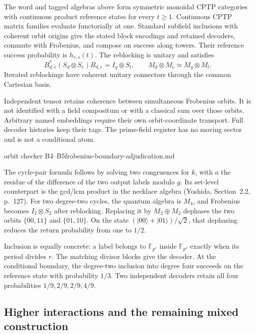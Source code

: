 \begin{proposition}
\statusProved\quad
The word and tagged algebras above form symmetric monoidal CPTP categories
with continuous product reference states for every $t\geq1$. Continuous
CPTP matrix families evaluate functorially at one. Standard subfield
inclusions with coherent orbit origins give the stated block encodings
and retained decoders, commute with Frobenius, and compose on success
along towers. Their reference success probability is $h_{r,s}(t)$.
The reblocking is unitary and satisfies
\[
 B_{d,e}^*(S_d\otimes S_e)B_{d,e}=I_g\otimes S_l,
 \qquad M_d\otimes M_e\simeq M_g\otimes M_l.
\]
Iterated reblockings have coherent unitary connectors through the common
Cartesian basis.
\end{proposition}
\begin{scope}
Independent tensor retains coherence between simultaneous Frobenius
orbits. It is not identified with a field compositum or with a classical
sum over those orbits. Arbitrary named embeddings require their own
orbit-coordinate transport. Full decoder histories keep their tags.
The prime-field register has no moving sector and is not a conditional atom.
\end{scope}
{orbit checker B4--B5}{frobenius-boundary-adjudication.md}

The cycle-pair formula follows by solving two congruences for $k$, with
$a$ the residue of the difference of the two output labels modulo $g$.
Its set-level counterpart is the gcd/lcm product in the necklace algebra
(Yoshida, Section~2.2, p.~127). For two degree-two cycles, the quantum
algebra is $M_4$, and Frobenius becomes $I_2\otimes S_2$ after reblocking.
Replacing it by $M_2\oplus M_2$ dephases the two orbits
$\{00,11\}$ and $\{01,10\}$. On the state
$(|00\rangle+|01\rangle)/\sqrt2$, that dephasing reduces the return
probability from one to $1/2$.

Inclusion is equally concrete: a label belongs to $\mathbb F_{p^r}$ inside
$\mathbb F_{p^s}$ exactly when its period divides $r$. The matching
divisor blocks give the decoder. At the conditional boundary, the
degree-two inclusion into degree four succeeds on the reference state
with probability $1/3$. Two independent decoders retain all four
probabilities $1/9,2/9,2/9,4/9$.

\subsection{Higher interactions and the remaining mixed construction}

